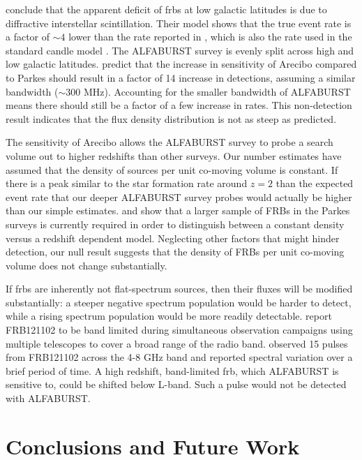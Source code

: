 \documentclass[a4paper,fleqn,usenatbib]{mnras}
\begin{document}
\cite{2015MNRAS.451.3278M} conclude that the apparent deficit of \glspl{frb} at
low galactic latitudes is due to diffractive interstellar scintillation. Their
model shows that the true event rate is a factor of $\sim 4$ lower than the rate
reported in \cite{2013Sci...341...53T}, which is also the rate used in the standard
candle model \citep{2013MNRAS.436L...5L}. The ALFABURST survey is evenly
split across high and low galactic latitudes.  \cite{2015MNRAS.451.3278M} predict
that the increase in sensitivity of Arecibo compared to Parkes should
result in a factor of 14 increase in detections, assuming a similar bandwidth
($\sim 300$ MHz). Accounting for the smaller bandwidth of ALFABURST means there
should still be a factor of a few increase in rates. This non-detection result
indicates that the \cite{2015MNRAS.451.3278M} flux density distribution is not
as steep as predicted.

The sensitivity of Arecibo allows the ALFABURST survey to probe a search volume
out to higher redshifts than other surveys. Our number estimates have assumed
that the density of sources per unit co-moving volume is constant.  If there is
a peak similar to the star formation rate around $z=2$
\citep{2014ARA&A..52..415M} than the expected event rate that our deeper
ALFABURST survey probes would actually be higher than our simple estimates.
\citet{2016MNRAS.458..708C} and \citet{ranethesis} show that a larger sample of
FRBs in the Parkes surveys is currently required in order to distinguish
between a constant density versus a redshift dependent model. Neglecting other
factors that might hinder detection, our null result suggests that the density
of FRBs per unit co-moving volume does not change substantially.

If \glspl{frb} are inherently not flat-spectrum sources, then their fluxes will
be modified substantially: a steeper negative spectrum population would be harder to
detect, while a rising spectrum population would be more readily detectable.
\cite{2017arXiv170507553L} report FRB121102 to be band limited during
simultaneous observation campaigns using multiple telescopes to cover a broad
range of the radio band. \cite{atel10675} observed 15 pulses from FRB121102
across the 4-8 GHz band and reported spectral variation over a brief period of
time. A high redshift, band-limited \gls{frb}, which ALFABURST is sensitive to,
could be shifted below L-band. Such a pulse would not be detected with
ALFABURST.

\section{Conclusions and Future Work}
\label{sec:future_work}
\end{document}

